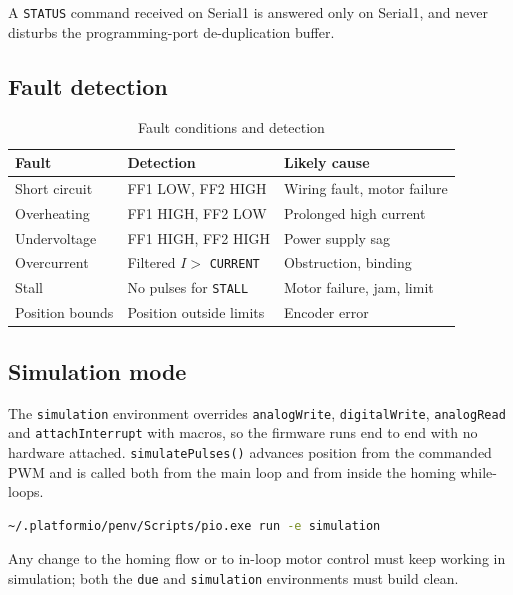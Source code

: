 \documentclass[11pt,a4paper]{article}
\begin{document}
A \texttt{STATUS} command received on Serial1 is answered only on Serial1, and never disturbs the programming-port de-duplication buffer.

\subsection{Fault detection}

\begin{table}[H]
\centering
\caption{Fault conditions and detection}
\label{tab:faults}
\begin{tabular}{lll}
\toprule
\textbf{Fault} & \textbf{Detection} & \textbf{Likely cause} \\
\midrule
Short circuit & FF1 LOW, FF2 HIGH & Wiring fault, motor failure \\
Overheating & FF1 HIGH, FF2 LOW & Prolonged high current \\
Undervoltage & FF1 HIGH, FF2 HIGH & Power supply sag \\
Overcurrent & Filtered $I >$ \texttt{CURRENT} & Obstruction, binding \\
Stall & No pulses for \texttt{STALL} & Motor failure, jam, limit \\
Position bounds & Position outside limits & Encoder error \\
\bottomrule
\end{tabular}
\end{table}

\subsection{Simulation mode}

The \texttt{simulation} environment overrides \texttt{analogWrite}, \texttt{digitalWrite}, \texttt{analogRead} and \texttt{attachInterrupt} with macros, so the firmware runs end to end with no hardware attached. \texttt{simulatePulses()} advances position from the commanded PWM and is called both from the main loop and from inside the homing while-loops.

\begin{lstlisting}[language=bash]
~/.platformio/penv/Scripts/pio.exe run -e simulation
\end{lstlisting}

Any change to the homing flow or to in-loop motor control must keep working in simulation; both the \texttt{due} and \texttt{simulation} environments must build clean.
\end{document}
